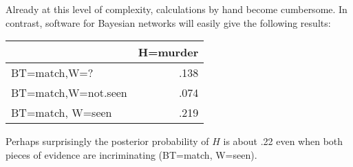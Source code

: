 \documentclass{article}
\begin{document}
\noindent Already at this level of complexity, calculations by hand become cumbersome. In contrast,  software for Bayesian networks \citep[see, for example, the $\textbf{\textsf{R}}$
package  $\textbf{\textsf{bnlearn}}$ developed by Marco Scutari and described in][]{Scutari2015Bayesian-Networ}
will easily give the following results: 
%
%
\begin{table}[H]
\centering
\begin{tabular}{lr}
\toprule
  & H=murder\\
\midrule
BT=match,W=? & .138\\
BT=match,W=not.seen & .074\\
BT=match, W=seen & .219\\
\bottomrule
\end{tabular}
\end{table}
%
\noindent
Perhaps surprisingly the posterior probability of $H$ is about .22 even when both pieces of evidence are incriminating (BT=match, W=seen).
%
%
\end{document}
